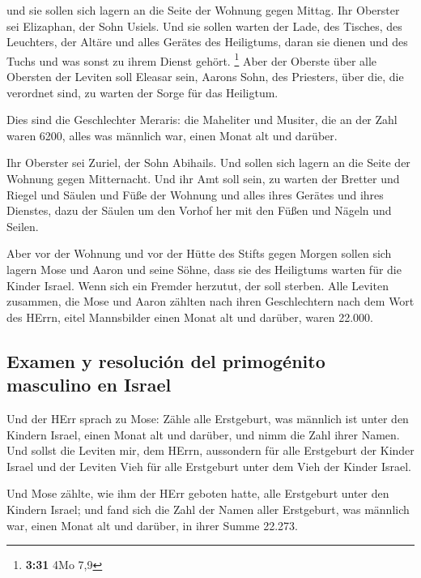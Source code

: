  und sie sollen sich lagern an die Seite der Wohnung
gegen Mittag.  Ihr Oberster sei Elizaphan, der Sohn
Usiels.  Und sie sollen warten der Lade, des Tisches, des
Leuchters, der Altäre und alles Gerätes des Heiligtums, daran sie dienen
und des Tuchs und was sonst zu ihrem Dienst gehört. \footnote{\textbf{3:31}
  4Mo 7,9}  Aber der Oberste über alle Obersten der
Leviten soll Eleasar sein, Aarons Sohn, des Priesters, über die, die
verordnet sind, zu warten der Sorge für das Heiligtum.

 Dies sind die Geschlechter Meraris: die Maheliter und
Musiter,  die an der Zahl waren 6200, alles was männlich
war, einen Monat alt und darüber.

 Ihr Oberster sei Zuriel, der Sohn Abihails. Und sollen
sich lagern an die Seite der Wohnung gegen Mitternacht. 
Und ihr Amt soll sein, zu warten der Bretter und Riegel und Säulen und
Füße der Wohnung und alles ihres Gerätes und ihres Dienstes,
 dazu der Säulen um den Vorhof her mit den Füßen und
Nägeln und Seilen.

 Aber vor der Wohnung und vor der Hütte des Stifts gegen
Morgen sollen sich lagern Mose und Aaron und seine Söhne, dass sie des
Heiligtums warten für die Kinder Israel. Wenn sich ein Fremder herzutut,
der soll sterben.  Alle Leviten zusammen, die Mose und
Aaron zählten nach ihren Geschlechtern nach dem Wort des HErrn, eitel
Mannsbilder einen Monat alt und darüber, waren 22.000.

\hypertarget{examen-y-resoluciuxf3n-del-primoguxe9nito-masculino-en-israel}{%
\subsection{Examen y resolución del primogénito masculino en
Israel}\label{examen-y-resoluciuxf3n-del-primoguxe9nito-masculino-en-israel}}

 Und der HErr sprach zu Mose: Zähle alle Erstgeburt, was
männlich ist unter den Kindern Israel, einen Monat alt und darüber, und
nimm die Zahl ihrer Namen.  Und sollst die Leviten mir,
dem HErrn, aussondern für alle Erstgeburt der Kinder Israel und der
Leviten Vieh für alle Erstgeburt unter dem Vieh der Kinder Israel.

 Und Mose zählte, wie ihm der HErr geboten hatte, alle
Erstgeburt unter den Kindern Israel;  und fand sich die
Zahl der Namen aller Erstgeburt, was männlich war, einen Monat alt und
darüber, in ihrer Summe 22.273.

